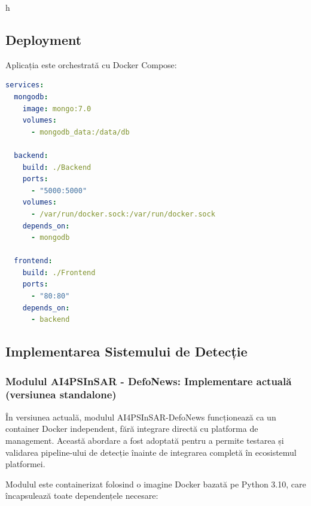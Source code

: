 h\documentclass[12pt,a4paper]{article}
\begin{document}
\subsection{Deployment}

Aplicația este orchestrată cu Docker Compose:

\begin{lstlisting}[language=yaml, caption=docker-compose.yml (simplificat)]
services:
  mongodb:
    image: mongo:7.0
    volumes:
      - mongodb_data:/data/db
  
  backend:
    build: ./Backend
    ports:
      - "5000:5000"
    volumes:
      - /var/run/docker.sock:/var/run/docker.sock
    depends_on:
      - mongodb
  
  frontend:
    build: ./Frontend
    ports:
      - "80:80"
    depends_on:
      - backend
\end{lstlisting}

\subsection{Implementarea Sistemului de Detecție}

\subsubsection{Modulul AI4PSInSAR - DefoNews: Implementare actuală (versiunea standalone)}

În versiunea actuală, modulul AI4PSInSAR-DefoNews funcționează ca un container Docker independent, fără integrare directă cu platforma de management. Această abordare a fost adoptată pentru a permite testarea și validarea pipeline-ului de detecție înainte de integrarea completă în ecosistemul platformei.

Modulul este containerizat folosind o imagine Docker bazată pe Python 3.10, care încapsulează toate dependențele necesare: 
\end{document}
